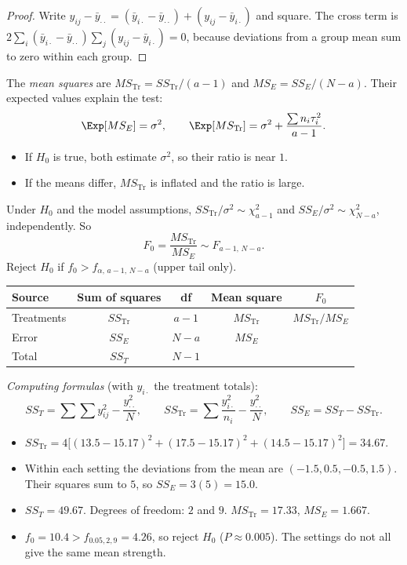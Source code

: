 \begin{proof}
Write $y_{ij}-\bar{y}_{\cdot\cdot}=(\bar{y}_{i\cdot}-\bar{y}_{\cdot\cdot})+(y_{ij}-\bar{y}_{i\cdot})$ and square. The cross term is $2\sum_i(\bar{y}_{i\cdot}-\bar{y}_{\cdot\cdot})\sum_j(y_{ij}-\bar{y}_{i\cdot})=0$, because deviations from a group mean sum to zero within each group.
\end{proof}

The \emph{mean squares} are $MS_{\mathrm{Tr}}=SS_{\mathrm{Tr}}/(a-1)$ and $MS_E=SS_E/(N-a)$. Their expected values explain the test:
\[ \Exp[MS_E]=\sigma^2,\qquad\Exp[MS_{\mathrm{Tr}}]=\sigma^2+\frac{\sum n_i\tau_i^2}{a-1}. \]
\begin{itemize}
  \item If $H_0$ is true, both estimate $\sigma^2$, so their ratio is near $1$.
  \item If the means differ, $MS_{\mathrm{Tr}}$ is inflated and the ratio is large.
\end{itemize}

\begin{theorem}\label{thm:anova-F}
Under $H_0$ and the model assumptions, $SS_{\mathrm{Tr}}/\sigma^2\sim\chi^2_{a-1}$ and $SS_E/\sigma^2\sim\chi^2_{N-a}$, independently. So
\[ F_0=\frac{MS_{\mathrm{Tr}}}{MS_E}\sim F_{a-1,\,N-a}. \]
Reject $H_0$ if $f_0>f_{\alpha,\,a-1,\,N-a}$ (upper tail only).
\end{theorem}

\begin{center}
\begin{tabular}{lcccc}
\toprule
Source & Sum of squares & df & Mean square & $F_0$ \\
\midrule
Treatments & $SS_{\mathrm{Tr}}$ & $a-1$ & $MS_{\mathrm{Tr}}$ & $MS_{\mathrm{Tr}}/MS_E$ \\
Error & $SS_E$ & $N-a$ & $MS_E$ & \\
Total & $SS_T$ & $N-1$ & & \\
\bottomrule
\end{tabular}
\end{center}

\emph{Computing formulas} (with $y_{i\cdot}$ the treatment totals):
\[ SS_T=\sum\sum y_{ij}^2-\frac{y_{\cdot\cdot}^2}N,\qquad SS_{\mathrm{Tr}}=\sum\frac{y_{i\cdot}^2}{n_i}-\frac{y_{\cdot\cdot}^2}N,\qquad SS_E=SS_T-SS_{\mathrm{Tr}}. \]

\begin{example}\label{ex:anovacalc}
\begin{itemize}
  \item $SS_{\mathrm{Tr}}=4\big[(13.5-15.17)^2+(17.5-15.17)^2+(14.5-15.17)^2\big]=34.67$.
  \item Within each setting the deviations from the mean are $(-1.5,0.5,-0.5,1.5)$. Their squares sum to $5$, so $SS_E=3(5)=15.0$.
  \item $SS_T=49.67$. Degrees of freedom: $2$ and $9$. $MS_{\mathrm{Tr}}=17.33$, $MS_E=1.667$.
  \item $f_0=10.4>f_{0.05,2,9}=4.26$, so reject $H_0$ ($P\approx0.005$). The settings do not all give the same mean strength.
\end{itemize}
\end{example}

